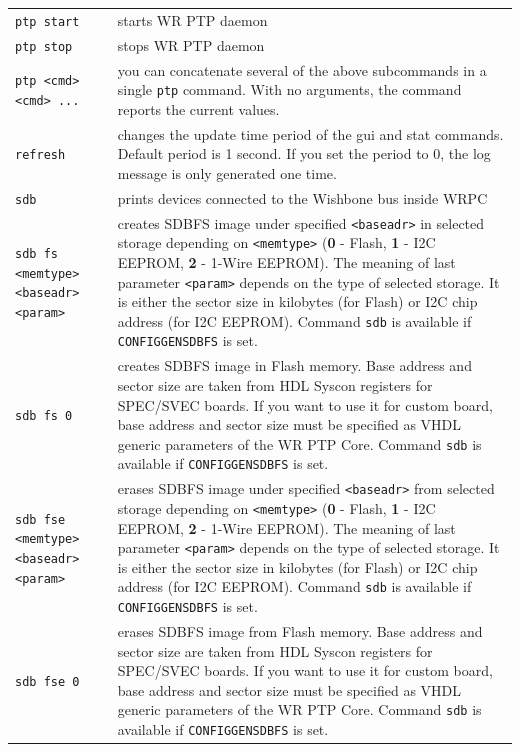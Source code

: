 \documentclass[a4paper, 12pt]{article}
\renewcommand{\_}{\underscore\allowbreak}
\newcommand{\code}[1]{\texttt{#1}}
\begin{document}
\begin{longtable}{  p{7.5cm}  p{7cm} }
  \code{ptp start} & starts WR PTP daemon \\

  \code{ptp stop} & stops WR PTP daemon \\

  \code{ptp <cmd> <cmd> ...} & you can concatenate several of the above
    subcommands in a single \texttt{ptp} command. With no arguments,
    the command reports the current values.\\

  \code{refresh} & changes the update time period of the gui and stat commands.
    Default period is 1 second. If you set the period to 0, the log message is
    only generated one time. \\

  \code{sdb} & prints devices connected to the Wishbone bus inside WRPC \\

  \code{sdb fs <memtype> <baseadr> <param>} & creates SDBFS image under
    specified \code{<baseadr>} in selected storage depending on \code{<memtype>}
    ({\bf 0} - Flash, {\bf 1} - I2C EEPROM, {\bf 2} - 1-Wire EEPROM). The meaning
    of last parameter \code{<param>} depends on the type of selected storage. It
    is either the sector size in kilobytes (for Flash) or I2C chip address (for
    I2C EEPROM). Command \code{sdb} is available if \texttt{CONFIG\_GENSDBFS}
    is set.\\

  \code{sdb fs 0} & creates SDBFS image in Flash memory. Base address and sector
    size are taken from HDL Syscon registers for SPEC/SVEC boards. If you want
    to use it for custom board, base address and sector size must be specified
    as VHDL generic parameters of the WR PTP Core. Command \code{sdb} is
    available if \texttt{CONFIG\_GENSDBFS} is set.\\

  \code{sdb fse <memtype> <baseadr> <param>} & erases SDBFS image under
    specified \code{<baseadr>} from selected storage depending on
    \code{<memtype>} ({\bf 0} - Flash, {\bf 1} - I2C EEPROM, {\bf 2} - 1-Wire
    EEPROM). The meaning of last parameter \code{<param>} depends on the type
    of selected storage. It is either the sector size in kilobytes (for Flash)
    or I2C chip address (for I2C EEPROM). Command \code{sdb} is available
    if \texttt{CONFIG\_GENSDBFS} is set.\\

  \code{sdb fse 0} & erases SDBFS image from Flash memory. Base address and sector
    size are taken from HDL Syscon registers for SPEC/SVEC boards. If you want
    to use it for custom board, base address and sector size must be specified
    as VHDL generic parameters of the WR PTP Core. Command \code{sdb} is
    available if \texttt{CONFIG\_GENSDBFS} is set.\\


\end{longtable}
\end{document}
